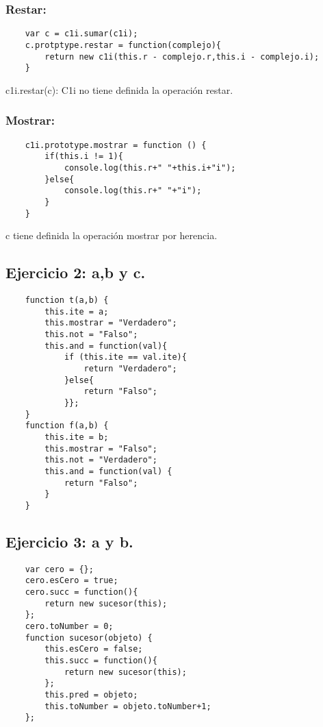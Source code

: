 \documentclass[10pt,a4paper]{article}
\begin{document}
\subsubsection{Restar:}
    \begin{lstlisting}
    var c = c1i.sumar(c1i);
    c.protptype.restar = function(complejo){
    	return new c1i(this.r - complejo.r,this.i - complejo.i);	
    }
    \end{lstlisting}
    c1i.restar(c): C1i no tiene definida la operación restar.
\subsubsection{Mostrar:}
    \begin{lstlisting}
    c1i.prototype.mostrar = function () {
    	if(this.i != 1){
    		console.log(this.r+" "+this.i+"i");
    	}else{
    		console.log(this.r+" "+"i");
    	}
    }
    \end{lstlisting}
    c tiene definida la operación mostrar por herencia.
\subsection{Ejercicio 2: a,b y c.}
    \begin{lstlisting}
    function t(a,b) {
    	this.ite = a;
    	this.mostrar = "Verdadero";
    	this.not = "Falso";
    	this.and = function(val){ 
    		if (this.ite == val.ite){
    			return "Verdadero";	
    		}else{
    			return "Falso";
    		}};
    }
    function f(a,b) {
    	this.ite = b;
    	this.mostrar = "Falso";
    	this.not = "Verdadero";
    	this.and = function(val) {
    		return "Falso";
    	}
    }
    \end{lstlisting}
\subsection{Ejercicio 3: a y b.}
    \begin{lstlisting}
    var cero = {};
    cero.esCero = true;
    cero.succ = function(){ 
    	return new sucesor(this);
    };
    cero.toNumber = 0;
    function sucesor(objeto) {
    	this.esCero = false;
    	this.succ = function(){ 
    		return new sucesor(this);
    	};
    	this.pred = objeto;
    	this.toNumber = objeto.toNumber+1;
    };
    \end{lstlisting}
\end{document}

